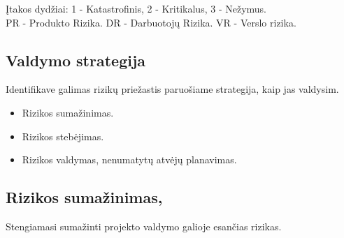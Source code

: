 \documentclass[a4paper,12pt]{article}
\begin{document}
\small

\k Itakos dydžiai: 
		1 - Katastrofinis,
		2 - Kritikalus,
		3 - Ne\v zymus.\\
		PR - Produkto Rizika. DR - Darbuotoj\k u Rizika. VR - Verslo rizika.
	
\subsection{Valdymo strategija}
Identifikave galimas rizik\k u prie\v zastis paruo\v siame strategija, kaip jas valdysim.
\begin{itemize}
  \item Rizikos suma\v zinimas.
  \item Rizikos steb\. ejimas.
  \item Rizikos valdymas, nenumatyt\k u atv\. ej\k u planavimas.
\end{itemize}

\clearpage

\normalsize


\subsection{Rizikos suma\v zinimas, }
Stengiamasi suma\v zinti projekto valdymo galioje esan\v cias rizikas.
\end{document}
